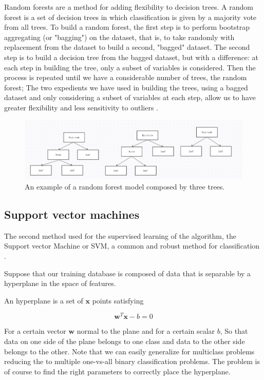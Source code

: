 \documentclass[a4paper]{report}
\begin{document}
Random forests are a method for adding flexibility to decision trees.
A random forest is a set of decision trees in which classification is given by a majority vote from all trees.
To build a random forest, the first step is to perform bootstrap aggregating (or "bagging") on the dataset, that is, to take randomly with replacement from the dataset to build a second, "bagged" dataset.
The second step is to build a decision tree from the bagged dataset, but with a difference:
at each step in building the tree, only a subset of variables is considered.
Then the process is repeated until we have a considerable number of trees, the random forest;
The two expedients we have used in building the trees, using a bagged dataset and only considering a subset of variables at each step, allow us to have greater flexibility and less sensitivity to outliers \cite{hastie2001data}.

\begin{figure} [H]
\centering
\includegraphics [width=\textwidth ] {o/forest.png}
\caption{An example of a random forest model composed by three trees.}
\label{forest}
\end{figure}



\subsection{Support vector machines}

The second method used for the supervised learning of the algorithm, the Support vector Machine or SVM, a common and robust method for classification
\cite{gunn1998support}.

Suppose that our training database is composed of data that is separable by a hyperplane in the space of features.

An hyperplane is a set of $\textbf{x}$ points satisfying

\begin{equation}
    \textbf{w}^T\textbf{x} -b = 0
\end{equation}

For a certain vector $\textbf{w}$ normal to the plane and for a certain scalar $b$, So that data on one side of the plane belongs to one class and data to the other side belongs to the other.
Note that we can easily generalize for multiclass problems reducing the to multiple one-vs-all binary classification problems.
The problem is of course to find the right parameters to correctly place the hyperplane.
\end{document}
